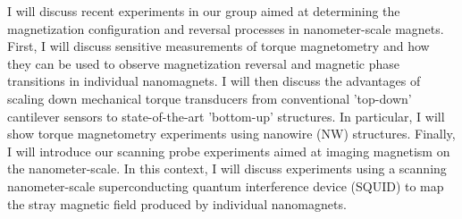 I will discuss recent experiments in our group aimed at determining the magnetization configuration and reversal processes in nanometer-scale magnets. First, I will discuss sensitive measurements of torque magnetometry and how they can be used to observe magnetization reversal and magnetic phase transitions in individual nanomagnets. I will then discuss the advantages of scaling down mechanical torque transducers from conventional 'top-down' cantilever sensors to state-of-the-art 'bottom-up' structures. In particular, I will show torque magnetometry experiments using nanowire (NW) structures. Finally, I will introduce our scanning probe experiments aimed at imaging magnetism on the nanometer-scale. In this context, I will discuss experiments using a scanning nanometer-scale superconducting quantum interference device (SQUID) to map the stray magnetic field produced by individual nanomagnets.
